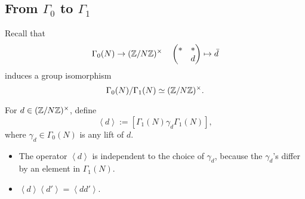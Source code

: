 \subsection{From $\Gamma_0$ to $\Gamma_1$}

Recall that \[\Gamma_0(N)\to(\mathbb{Z}/N\mathbb{Z})^\times\quad \begin{pmatrix}
    *&*\\*&d
\end{pmatrix}\mapsto \bar{d}\] induces a group isomorphism \[\Gamma_0(N)/\Gamma_1(N)\simeq (\mathbb{Z}/N\mathbb{Z})^\times.\]
\begin{definition}
    For $d\in(\mathbb{Z}/N\mathbb{Z})^\times$, define \[\left<d\right> := [\Gamma_1(N)\gamma_d\Gamma_1(N)],\]
    where $\gamma_d\in\Gamma_0(N)$ is any lift of $d$.
\end{definition}
\begin{itemize}
    \item The operator $\left<d\right>$ is independent to the choice of $\gamma_d$, because the $\gamma_d$'s differ by an element in $\Gamma_1(N)$.
    \item $\left< d\right>\left<d'\right> = \left<dd'\right>$.
\end{itemize}


